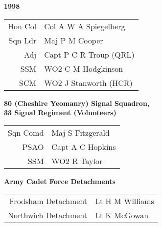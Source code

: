 \begin{center}
  \Huge
  \textbf{1998}
\end{center}

\begin{center}
  \small
  \begin{tabular}{rl}
    Hon Col & Col A W A Spiegelberg \\
    Sqn Ldr & Maj P M Cooper \\
    Adj & Capt P C R Troup (QRL) \\
    SSM & WO2 C M Hodgkinson \\
    SCM & WO2 J Stanworth (HCR) \\
  \end{tabular}
\end{center}

\begin{center}
  \Large
  \textbf{80 (Cheshire Yeomanry) Signal Squadron, \\ 33 Signal Regiment (Volunteers)}
\end{center}

\begin{center}
  \small
  \begin{tabular}{rl}
    Sqn Comd & Maj S Fitzgerald \\
    PSAO & Capt A C Hopkins \\
    SSM & WO2 R Taylor \\
  \end{tabular}
\end{center}

\begin{center}
  \Large
  \textbf{Army Cadet Force Detachments}
\end{center}

\begin{center}
  \small
  \begin{tabular}{rl}
    Frodsham Detachment & Lt H M Williams \\
    Northwich Detachment & Lt K McGowan \\
  \end{tabular}
\end{center}

\vspace{50mm}

\pagebreak
